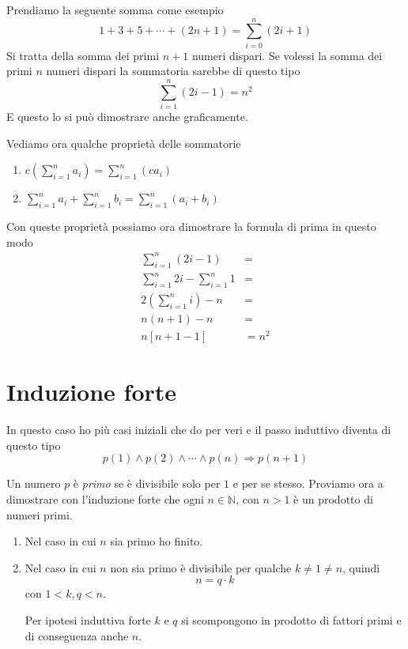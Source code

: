 \begin{example}
	Prendiamo la seguente somma come esempio
	\[ 1 + 3 + 5 + \cdots + (2n + 1) = \sum_{i = 0}^n (2i + 1) \]
	Si tratta della somma dei primi $n + 1$ numeri dispari. Se volessi la somma dei primi $n$ numeri dispari la
	sommatoria sarebbe di questo tipo
	\[ \sum_{i = 1}^n (2i - 1) = n^2 \]
	E questo lo si pu\`o dimostrare anche graficamente.
\end{example}

Vediamo ora qualche propriet\`a delle sommatorie
\begin{enumerate}
	\item $c \left( \sum_{i = 1}^n a_i \right) = \sum_{i = 1}^n (c a_i)$
	\item $\sum_{i = 1}^n a_i + \sum_{i = 1}^n b_i = \sum_{i = 1}^n (a_i + b_i)$
\end{enumerate}

Con queste propriet\`a possiamo ora dimostrare la formula di prima in questo modo
\begin{align*}
	\sum_{i = 1}^n (2i - 1)               & =     \\
	\sum_{i = 1}^n 2i - \sum_{i = 1}^n 1  & =     \\
	2 \left( \sum_{i = 1}^n i \right) - n & =     \\
	n(n + 1) - n                          & =     \\
	n [n + 1 - 1]                         & = n^2
\end{align*}

\section{Induzione forte}
In questo caso ho pi\`u casi iniziali che do per veri e il passo induttivo diventa di questo tipo
\[ p(1) \wedge p(2) \wedge \cdots \wedge p(n) \Rightarrow p(n + 1) \]

\begin{example}
	Un numero $p$ \`e \emph{primo} se \`e divisibile solo per $1$ e per se stesso. Proviamo ora a dimostrare con
	l'induzione forte che ogni $n \in \mathbb{N}$, con $n > 1$ \`e un prodotto di numeri primi.
	\begin{enumerate}
		\item Nel caso in cui $n$ sia primo ho finito.
		\item Nel caso in cui $n$ non sia primo \`e divisibile per qualche $k \neq 1 \neq n$, quindi
		      \[ n = q \cdot k \]
		      con $1 < k, q < n$.

		      Per ipotesi induttiva forte $k$ e $q$ si scompongono in prodotto di fattori primi e di conseguenza anche
		      $n$.
	\end{enumerate}
\end{example}

